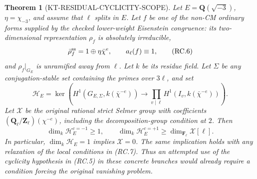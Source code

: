 \documentclass[11pt,a4paper]{article}
\newtheorem{theorem}{Theorem}[section]
\theoremstyle{definition}
\begin{document}
\begin{theorem}[KT-RESIDUAL-CYCLICITY-SCOPE]
Let $E=\mathbf Q(\sqrt{-3})$, $\eta=\chi_{-3}$,
and assume that $\ell$ splits in $E$.  Let $f$ be one
of the non-CM ordinary forms supplied by the checked
lower-weight Eisenstein congruence: its two-dimensional
representation $\rho_f$ is absolutely irreducible,
\[
 \bar\rho_f^{\rm ss}=1\oplus\eta\bar\chi^e,
 \qquad a_\ell(f)\equiv1,
                                                               \tag{RC.6}
\]
and $\rho_f|_{G_E}$ is unramified away from $\ell$.
Let $k$ be its residue field.  Let $\Sigma$ be any
conjugation-stable set containing the primes over
$3\ell$, and set
\[
 \mathcal H_E=
 \ker\left(H^1(G_{E,\Sigma},k(\bar\chi^{-e}))
       \longrightarrow\prod_{v\mid\ell}
                         H^1(I_v,k(\bar\chi^{-e}))\right).
                                                               \tag{RC.7}
\]
Let $\mathcal X$ be the original rational strict
Selmer group with coefficients
$(\mathbf Q_\ell/\mathbf Z_\ell)(\chi^{-e})$,
including the decomposition-group condition at $2$.
Then
\[
 \dim_k\mathcal H_E^{c=-1}\geq1,\qquad
 \dim_k\mathcal H_E^{c=+1}
          \geq\dim_{\mathbf F_\ell}\mathcal X[\ell].
                                                               \tag{RC.8}
\]
In particular, $\dim_k\mathcal H_E=1$ implies
$\mathcal X=0$.  The same implication holds with any
relaxation of the local conditions in (RC.7).
Thus an attempted use of the cyclicity hypothesis in
(RC.5) in these concrete branches would already require
a condition forcing the original vanishing problem.
\end{theorem}
\end{document}
